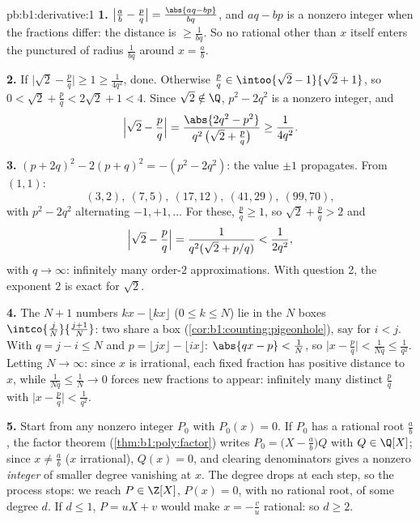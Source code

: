 \begin{solution}{pb:b1:derivative:1}
\textbf{1.} $\bigl|\frac ab - \frac pq\bigr| = \frac{\abs{aq -
bp}}{bq}$, and $aq - bp$ is a nonzero integer when the fractions
differ: the distance is $\geq \frac{1}{bq}$. So no rational
other than $x$ itself enters the punctured  of radius
$\frac{1}{bq}$ around $x = \frac ab$.

\textbf{2.} If $\bigl|\sqrt2 - \frac pq\bigr| \geq 1 \geq
\frac{1}{4q^2}$, done. Otherwise $\frac pq \in \intoo{\sqrt2 -
1}{\sqrt2 + 1}$, so $0 < \sqrt2 + \frac pq < 2\sqrt2 + 1 < 4$.
Since $\sqrt 2 \notin \Q$, $p^2 - 2q^2$ is a nonzero integer, and
\[
\Bigl|\sqrt2 - \frac pq\Bigr|
= \frac{\abs{2q^2 - p^2}}{q^2\,\bigl(\sqrt2 + \frac pq\bigr)}
\geq \frac{1}{4q^2} .
\]

\textbf{3.} $(p + 2q)^2 - 2(p + q)^2 = -(p^2 - 2q^2)$: the value
$\pm1$ propagates. From $(1,1)$:
\[
(3,2),\ (7,5),\ (17,12),\ (41,29),\ (99,70),
\]
with $p^2 - 2q^2$ alternating $-1, +1, \dots$
For these, $\frac pq \geq 1$, so $\sqrt2 + \frac pq > 2$ and
\[
\Bigl|\sqrt2 - \frac pq\Bigr| =
\frac{1}{q^2(\sqrt2 + p/q)} < \frac{1}{2q^2} ,
\]
with $q \to \infty$: infinitely many order-$2$ approximations.
With question 2, the exponent $2$ is exact for $\sqrt 2$.

\textbf{4.} The $N + 1$ numbers $kx - \lfloor kx\rfloor$ ($0
\leq k \leq N$) lie in the $N$ boxes $\intco{\frac
jN}{\frac{j+1}{N}}$: two share a box
(\cref{cor:b1:counting:pigeonhole}), say for $i < j$. With $q =
j - i \leq N$ and $p = \lfloor jx\rfloor - \lfloor ix\rfloor$:
$\abs{qx - p} < \frac1N$, so $\bigl|x - \frac pq\bigr| <
\frac{1}{Nq} \leq \frac{1}{q^2}$. Letting $N \to \infty$: since
$x$ is irrational, each fixed fraction has positive distance to
$x$, while $\frac{1}{Nq} \leq \frac 1N \to 0$ forces new
fractions to appear: infinitely many distinct $\frac pq$ with
$\bigl|x - \frac pq\bigr| < \frac{1}{q^2}$.

\textbf{5.} Start from any nonzero integer $P_0$ with $P_0(x) =
0$. If $P_0$ has a rational root $\frac ab$, the factor theorem
(\cref{thm:b1:poly:factor}) writes $P_0 = \bigl(X - \frac
ab\bigr)Q$ with $Q \in \Q[X]$;
since $x \neq \frac ab$ ($x$ irrational), $Q(x) = 0$, and
clearing denominators gives a nonzero \emph{integer} 
of smaller degree vanishing at $x$. The degree drops at each
step, so the process stops: we reach $P \in \Z[X]$, $P(x) = 0$,
with no rational root, of some degree $d$. If $d \leq 1$, $P =
uX + v$ would make $x = -\frac vu$ rational: so $d \geq 2$.


\end{solution}

